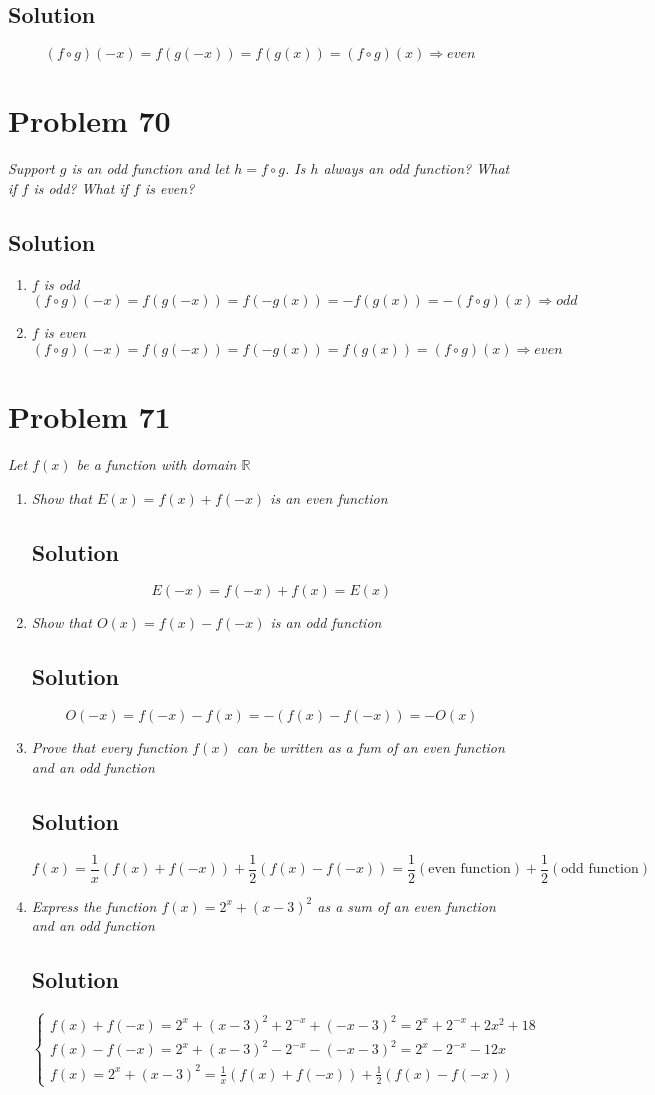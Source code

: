 \documentclass[11pt]{article}
\newcommand{\soln}{\subsection*}
\newcommand{\qn}{\textit}
\begin{document}
\soln{Solution}
$$(f \circ g)(-x)=f(g(-x))=f(g(x))=(f \circ g)(x) \Rightarrow even$$

\section*{Problem 70}

\qn{Support $g$ is an odd function and let $h=f \circ g$. Is $h$ always an odd function? What if $f$ is odd? What if $f$ is even?}

\soln{Solution}
\begin{enumerate}
	\item \qn{$f$ is odd}
	$$(f \circ g)(-x)=f(g(-x))=f(-g(x))=-f(g(x))=-(f \circ g)(x) \Rightarrow odd$$
	
	\item \qn{$f$ is even}
	$$(f \circ g)(-x)=f(g(-x))=f(-g(x))=f(g(x))=(f \circ g)(x) \Rightarrow even$$
\end{enumerate}

\section*{Problem 71}

\qn{Let $f(x)$ be a function with domain $\mathbb{R}$}

\begin{enumerate}
	\item \qn{Show that $E(x)=f(x)+f(-x)$ is an even function}
	\soln{Solution}
	$$E(-x)=f(-x)+f(x)=E(x)$$
	
	\item \qn{Show that $O(x)=f(x)-f(-x)$ is an odd function}
	\soln{Solution}
	$$O(-x)=f(-x)-f(x)=-(f(x)-f(-x))=-O(x)$$
	
	\item \qn{Prove that every function $f(x)$ can be written as a fum of an even function and an odd function}
	\soln{Solution}
	$$f(x)=\frac{1}{x}(f(x)+f(-x))+\frac{1}{2}(f(x)-f(-x))=\frac{1}{2}(\text{even function})+\frac{1}{2}(\text{odd function})$$
	
	\item \qn{Express the function $f(x)=2^x+(x-3)^2$ as a sum of an even function and an odd function}
	\soln{Solution}
	\begin{equation*}
		\begin{cases}
			f(x)+f(-x)=2^x+(x-3)^2+2^{-x}+(-x-3)^2=2^x+2^{-x}+2x^2+18 \\
			f(x)-f(-x)=2^x+(x-3)^2-2^{-x}-(-x-3)^2=2^x-2^{-x}-12x \\
			f(x)=2^x+(x-3)^2=\frac{1}{x}(f(x)+f(-x))+\frac{1}{2}(f(x)-f(-x))
		\end{cases}
	\end{equation*}
\end{enumerate}
	
\end{document}
